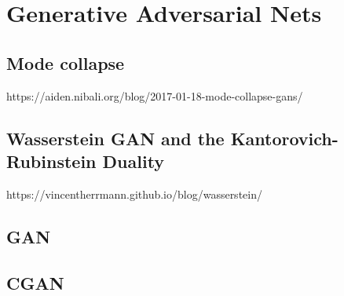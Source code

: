 \chapter{Generative Adversarial Nets}

\section{Mode collapse}
https://aiden.nibali.org/blog/2017-01-18-mode-collapse-gans/

\section{Wasserstein GAN and the Kantorovich-Rubinstein Duality}
https://vincentherrmann.github.io/blog/wasserstein/

\section{GAN}

\section{CGAN}